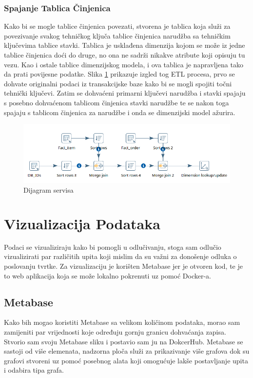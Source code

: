 \documentclass[12pt, oneside]{book}
\begin{document}
\subsection{Spajanje Tablica Činjenica}
Kako bi se mogle tablice činjenica povezati, stvorena je tablica koja služi za povezivanje svakog tehničkog ključa tablice činjenica narudžba sa tehničkim ključevima tablice stavki. Tablica je usklađena dimenzija kojom se može iz jedne tablice činjenica doći do druge, no ona ne sadrži nikakve atribute koji opisuju tu vezu. Kao i ostale tablice dimenzijskog modela, i ova tablica je napravljena tako da prati povijesne podatke. Slika \ref{RefOrder} prikazuje izgled tog ETL procesa, prvo se dohvate originalni podaci iz transakcijske baze kako bi se mogli spojiti točni tehnički ključevi. Zatim se dohvaćeni primarni ključevi narudžba i stavki spajaju s posebno dohvaćenom tablicom činjenica stavki narudžbe te se nakon toga spajaju s tablicom činjenica za narudžbe i onda se dimenzijski model ažurira.  

\begin{figure}[H]
\label{RefOrder}
\includegraphics[width=16cm]{images/i07_Pentaho-Ref-Order-Items.png}
\centering
\caption{Dijagram servisa}
\end{figure}

\chapter{Vizualizacija Podataka}
\label{Cviz}
Podaci se vizualiziraju kako bi pomogli u odlučivanju, stoga sam odlučio vizualizirati par različitih upita koji mislim da su važni za donošenje odluka o poslovanju tvrtke. Za vizualizaciju je korišten Metabase jer je otvoren kod, te je to web aplikacija koja se može lokalno pokrenuti uz pomoć Docker-a.

\section{Metabase}
Kako bih mogao koristiti Metabase sa velikom količinom podataka, morao sam zamijeniti par vrijednosti koje određuju gornju granicu dohvaćanja zapisa. Stvorio sam svoju Metabase sliku i postavio sam ju na DokcerHub. Metabase se sastoji od više elemenata, nadzorna ploča služi za prikazivanje više grafova dok su grafovi stvoreni uz pomoć posebnog alata koji omogućuje lakše postavljanje upita i odabira tipa grafa.
\end{document}
